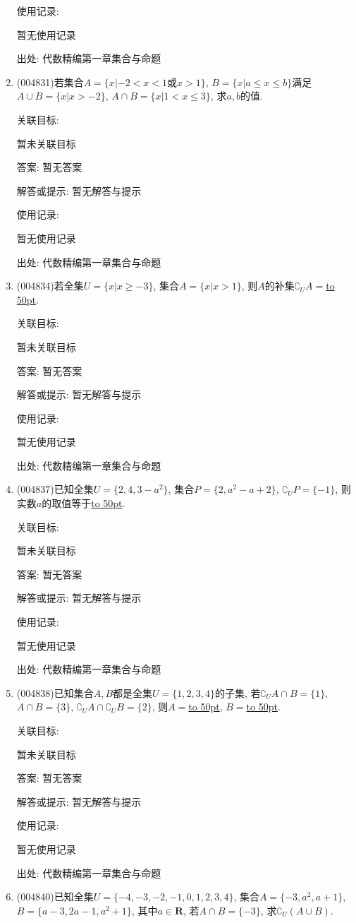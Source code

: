 \documentclass[10pt,a4paper]{article}
\newcommand{\blank}[1]{\underline{\hbox to #1pt{}}}
\begin{document}
\begin{enumerate}[1.]
使用记录:

暂无使用记录


出处: 代数精编第一章集合与命题
\item { (004831)}若集合$A=\{x|-2<x<1\text{或}x>1\}$, $B=\{x|a\le x\le b\}$满足$A\cup B=\{x|x>-2\}$, $A\cap B=\{x|1<x\le 3\}$, 求$a,b$的值.


关联目标:

暂未关联目标

答案: 暂无答案

解答或提示: 暂无解答与提示

使用记录:

暂无使用记录


出处: 代数精编第一章集合与命题
\item { (004834)}若全集$U=\{x|x\ge -3\}$, 集合$A=\{x|x>1\}$, 则$A$的补集$\complement_UA=$\blank{50}.


关联目标:

暂未关联目标

答案: 暂无答案

解答或提示: 暂无解答与提示

使用记录:

暂无使用记录


出处: 代数精编第一章集合与命题
\item { (004837)}已知全集$U=\{2,4,3-a^2\}$, 集合$P=\{2,a^2-a+2\}$, $\complement_UP=\{-1\}$, 则实数$a$的取值等于\blank{50}.


关联目标:

暂未关联目标

答案: 暂无答案

解答或提示: 暂无解答与提示

使用记录:

暂无使用记录


出处: 代数精编第一章集合与命题
\item { (004838)}已知集合$A,B$都是全集$U=\{1,2,3,4\}$的子集, 若$\complement_UA\cap B=\{1\}$, $A\cap B=\{3\}$, $\complement_UA\cap \complement_UB=\{2\}$, 则$A=$\blank{50}, $B=$\blank{50}.


关联目标:

暂未关联目标

答案: 暂无答案

解答或提示: 暂无解答与提示

使用记录:

暂无使用记录


出处: 代数精编第一章集合与命题
\item { (004840)}已知全集$U=\{-4,-3,-2,-1,0,1,2,3,4\}$, 集合$A=\{-3,a^2,a+1\}$, $B=\{a-3,2a-1,a^2+1\}$, 其中$a\in \mathbf{R}$, 若$A\cap B=\{-3\}$, 求$\complement_U(A\cup B)$.



\end{enumerate}
\end{document}
